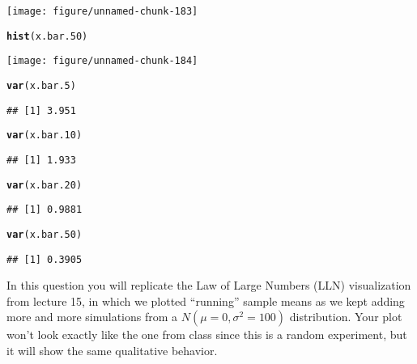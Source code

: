 \documentclass[addpoints,12pt]{exam}\usepackage[]{graphicx}\usepackage[]{color}
\makeatletter
\def\maxwidth{ %
  \ifdim\Gin@nat@width>\linewidth
    \linewidth
  \else
    \Gin@nat@width
  \fi
}
\newcommand{\hlstd}[1]{\textcolor[rgb]{0.345,0.345,0.345}{#1}}%
\newcommand{\hlkwd}[1]{\textcolor[rgb]{0.737,0.353,0.396}{\textbf{#1}}}%
\newenvironment{kframe}{%
 \def\at@end@of@kframe{}%
 \ifinner\ifhmode%
  \def\at@end@of@kframe{\end{minipage}}%
  \begin{minipage}{\columnwidth}%
 \fi\fi%
 \def\FrameCommand##1{\hskip\@totalleftmargin \hskip-\fboxsep
 \colorbox{shadecolor}{##1}\hskip-\fboxsep
     \hskip-\linewidth \hskip-\@totalleftmargin \hskip\columnwidth}%
 \MakeFramed {\advance\hsize-\width
   \@totalleftmargin\z@ \linewidth\hsize
   \@setminipage}}%
 {\par\unskip\endMakeFramed%
 \at@end@of@kframe}
\newenvironment{knitrout}{}{} %
\makeatother
\begin{document}
\begin{questions}
\begin{parts}
\begin{solution}
\begin{knitrout}
{\centering \texttt{[image: figure/unnamed-chunk-183]} 

}


\begin{kframe}\begin{alltt}
\hlkwd{hist}\hlstd{(x.bar.50)}
\end{alltt}
\end{kframe}

{\centering \texttt{[image: figure/unnamed-chunk-184]} 

}


\begin{kframe}\begin{alltt}
\hlkwd{var}\hlstd{(x.bar.5)}
\end{alltt}
\begin{verbatim}
## [1] 3.951
\end{verbatim}
\begin{alltt}
\hlkwd{var}\hlstd{(x.bar.10)}
\end{alltt}
\begin{verbatim}
## [1] 1.933
\end{verbatim}
\begin{alltt}
\hlkwd{var}\hlstd{(x.bar.20)}
\end{alltt}
\begin{verbatim}
## [1] 0.9881
\end{verbatim}
\begin{alltt}
\hlkwd{var}\hlstd{(x.bar.50)}
\end{alltt}
\begin{verbatim}
## [1] 0.3905
\end{verbatim}
\end{kframe}
\end{knitrout}
\end{solution}
	\end{parts}
\question In this question you will replicate the Law of Large Numbers (LLN) visualization from lecture 15, in which we plotted ``running'' sample means as we kept adding more and more simulations from a $N(\mu = 0, \sigma^2 = 100)$ distribution. Your plot won't look exactly like the one from class since this is a random experiment, but it will show the same qualitative behavior.
    \begin{parts}

\end{parts}
\end{questions}
\end{document}
